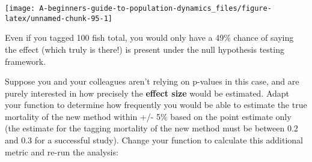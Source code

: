 \documentclass[]{book}
\begin{document}
\begin{center}\texttt{[image: A-beginners-guide-to-population-dynamics\_files/figure-latex/unnamed-chunk-95-1]} \end{center}

Even if you tagged 100 fish total, you would only have a 49\% chance of saying the effect (which truly is there!) is present under the null hypothesis testing framework.

Suppose you and your colleagues aren't relying on p-values in this case, and are purely interested in how precisely the \textbf{effect size} would be estimated. Adapt your function to determine how frequently you would be able to estimate the true mortality of the new method within +/- 5\% based on the point estimate only (the estimate for the tagging mortality of the new method must be between 0.2 and 0.3 for a successful study). Change your function to calculate this additional metric and re-run the analysis:
\end{document}
